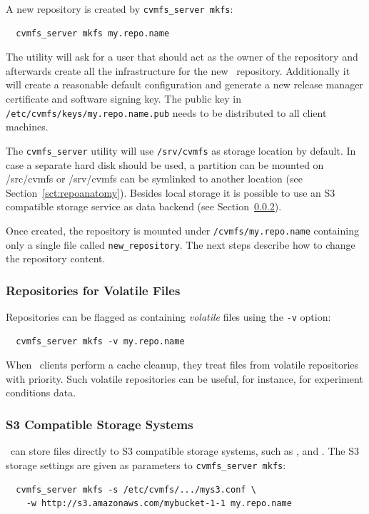 A new repository is created by \texttt{cvmfs\_server mkfs}:
\begin{verbatim}
  cvmfs_server mkfs my.repo.name
\end{verbatim}
The utility will ask for a user that should act as the owner of the repository and afterwards create all the infrastructure for the new \cvmfs\ repository.
Additionally it will create a reasonable default configuration and generate a new release manager certificate and software signing key.
The public key in \texttt{/etc/cvmfs/keys/my.repo.name.pub} needs to be distributed to all client machines.

The \texttt{cvmfs\_server} utility will use \texttt{/srv/cvmfs} as storage location by default.
In case a separate hard disk should be used, a partition can be mounted on /src/cvmfs or /srv/cvmfs can be symlinked to another location (see Section~\ref{sct:repoanatomy}).
Besides local storage it is possible to use an S3 compatible storage service as data backend (see Section~\ref{sct:s3storagesetup}).

Once created, the repository is mounted under \texttt{/cvmfs/my.repo.name} containing only a single file called \texttt{new\_repository}.
The next steps describe how to change the repository content.

\subsubsection{Repositories for Volatile Files}
Repositories can be flagged as containing \emph{volatile} files using the \texttt{-v} option:
\begin{verbatim}
  cvmfs_server mkfs -v my.repo.name
\end{verbatim}
When \cvmfs\ clients perform a cache cleanup, they treat files from volatile repositories with priority.
Such volatile repositories can be useful, for instance, for experiment conditions data.

\subsubsection{S3 Compatible Storage Systems}
\label{sct:s3storagesetup}

\cvmfs\ can store files directly to S3 compatible storage systems, such as ,  and .
The S3 storage settings are given as parameters to \texttt{cvmfs\_server mkfs}:
\begin{verbatim}
  cvmfs_server mkfs -s /etc/cvmfs/.../mys3.conf \
    -w http://s3.amazonaws.com/mybucket-1-1 my.repo.name
\end{verbatim}

